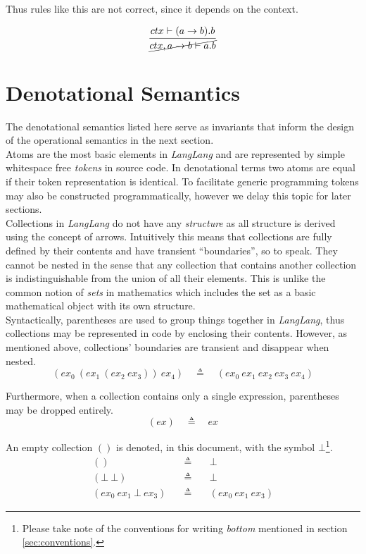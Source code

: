\documentclass[a4paper,11pt]{article}
\begin{document}
Thus rules like this are not correct, since it depends on the context.

\[
\infer{\cancel{ctx,a \rightarrow b \vdash a.b}}{ctx \vdash (a \rightarrow b).b}
\]


\section{Denotational Semantics}

The denotational semantics listed here serve as invariants that inform the design of the operational semantics in the next section.\\

Atoms are the most basic elements in \textsl{LangLang} and are represented by simple whitespace free \emph{tokens} in source code.
In denotational terms two atoms are equal if their token representation is identical.
To facilitate generic programming tokens may also be constructed programmatically, however we delay this topic for later sections.\\

Collections in \textsl{LangLang} do not have any \emph{structure} as all structure is derived using the concept of arrows.
Intuitively this means that collections are fully defined by their contents and have transient ``boundaries'', so to speak.
They cannot be nested in the sense that any collection that contains another collection is indistinguishable from the union of all their elements.
This is unlike the common notion of \emph{sets} in mathematics which includes the set as a basic mathematical object with its own structure.\\

Syntactically, parentheses are used to group things together in \textsl{LangLang}, thus collections may be represented in code by enclosing their contents.
However, as mentioned above, collections' boundaries are transient and disappear when nested.
\[
(ex_0\ (ex_1\ (ex_2\ ex_3))\ ex_4) \quad\triangleq\quad (ex_0\ ex_1\ ex_2\ ex_3\ ex_4)
\]

Furthermore, when a collection contains only a single expression, parentheses may be dropped entirely.
\[
(ex) \quad\triangleq\quad ex
\]

An empty collection $()$ is denoted, in this document, with the symbol $\bot$\footnote{Please take note of the conventions for writing \emph{bottom} mentioned in section \ref{sec:conventions}.}.
\begin{eqnarray*}
() \quad&\triangleq&\quad \bot \\
(\bot\ \bot) \quad&\triangleq&\quad \bot \\
(ex_0\ ex_1\ \bot\ ex_3) \quad&\triangleq&\quad (ex_0\ ex_1\ ex_3)
\end{eqnarray*}
\end{document}
